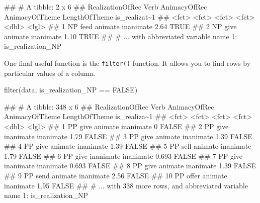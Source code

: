 \documentclass[
]{book}
\newenvironment{Shaded}{\begin{snugshade}}{\end{snugshade}}
\newcommand{\ConstantTok}[1]{\textcolor[rgb]{0.00,0.00,0.00}{#1}}
\newcommand{\FunctionTok}[1]{\textcolor[rgb]{0.00,0.00,0.00}{#1}}
\newcommand{\NormalTok}[1]{#1}
\newcommand{\SpecialCharTok}[1]{\textcolor[rgb]{0.00,0.00,0.00}{#1}}
\begin{document}
\begin{Shaded}
\begin{Highlighting}[]
\NormalTok{\#\# \# A tibble: 2 x 6}
\NormalTok{\#\#   RealizationOfRec Verb  AnimacyOfRec AnimacyOfTheme LengthOfTheme is\_realizat\textasciitilde{}1}
\NormalTok{\#\#   \textless{}fct\textgreater{}            \textless{}fct\textgreater{} \textless{}fct\textgreater{}        \textless{}fct\textgreater{}                  \textless{}dbl\textgreater{} \textless{}lgl\textgreater{}        }
\NormalTok{\#\# 1 NP               feed  animate      inanimate               2.64 TRUE         }
\NormalTok{\#\# 2 NP               give  animate      inanimate               1.10 TRUE         }
\NormalTok{\#\# \# ... with abbreviated variable name 1: is\_realization\_NP}
\end{Highlighting}
\end{Shaded}

One final useful function is the \texttt{filter()} function. It allows you to find rows by particular values of a column.

\begin{Shaded}
\begin{Highlighting}[]
\FunctionTok{filter}\NormalTok{(data, is\_realization\_NP }\SpecialCharTok{==} \ConstantTok{FALSE}\NormalTok{)}
\end{Highlighting}
\end{Shaded}

\begin{Shaded}
\begin{Highlighting}[]
\NormalTok{\#\# \# A tibble: 348 x 6}
\NormalTok{\#\#    RealizationOfRec Verb  AnimacyOfRec AnimacyOfTheme LengthOfTheme is\_realiza\textasciitilde{}1}
\NormalTok{\#\#    \textless{}fct\textgreater{}            \textless{}fct\textgreater{} \textless{}fct\textgreater{}        \textless{}fct\textgreater{}                  \textless{}dbl\textgreater{} \textless{}lgl\textgreater{}       }
\NormalTok{\#\#  1 PP               give  animate      inanimate              0     FALSE       }
\NormalTok{\#\#  2 PP               give  inanimate    inanimate              1.79  FALSE       }
\NormalTok{\#\#  3 PP               give  animate      inanimate              1.39  FALSE       }
\NormalTok{\#\#  4 PP               give  animate      inanimate              1.39  FALSE       }
\NormalTok{\#\#  5 PP               sell  animate      inanimate              1.79  FALSE       }
\NormalTok{\#\#  6 PP               give  inanimate    inanimate              0.693 FALSE       }
\NormalTok{\#\#  7 PP               give  inanimate    inanimate              0.693 FALSE       }
\NormalTok{\#\#  8 PP               give  animate      inanimate              1.39  FALSE       }
\NormalTok{\#\#  9 PP               send  animate      inanimate              2.56  FALSE       }
\NormalTok{\#\# 10 PP               offer animate      inanimate              1.95  FALSE       }
\NormalTok{\#\# \# ... with 338 more rows, and abbreviated variable name 1: is\_realization\_NP}
\end{Highlighting}
\end{Shaded}
\end{document}
